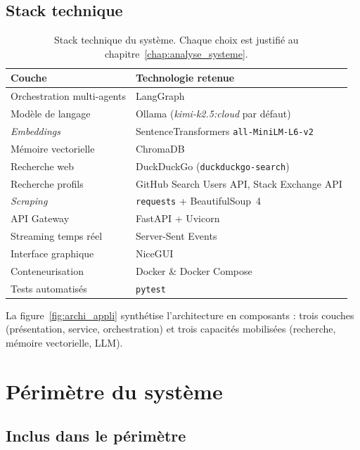 \subsection{Stack technique}

\begin{table}[H]
\centering
\small
\begin{tabular}{@{}ll@{}}
\toprule
\textbf{Couche} & \textbf{Technologie retenue} \\
\midrule
Orchestration multi-agents & LangGraph \cite{langgraph} \\
Modèle de langage          & Ollama (\emph{kimi-k2.5:cloud} par défaut) \cite{ollama} \\
\emph{Embeddings}          & SentenceTransformers \texttt{all-MiniLM-L6-v2} \cite{sbert} \\
Mémoire vectorielle        & ChromaDB \cite{chromadb} \\
Recherche web              & DuckDuckGo (\texttt{duckduckgo-search}) \\
Recherche profils          & GitHub Search Users API, Stack Exchange API \\
\emph{Scraping}            & \texttt{requests} + BeautifulSoup~4 \\
API Gateway                & FastAPI + Uvicorn \cite{fastapi} \\
Streaming temps réel       & Server-Sent Events \cite{sse_w3c} \\
Interface graphique        & NiceGUI \cite{nicegui} \\
Conteneurisation           & Docker \& Docker Compose \\
Tests automatisés          & \texttt{pytest} \\
\bottomrule
\end{tabular}
\caption{Stack technique du système. Chaque choix est justifié au chapitre~\ref{chap:analyse_systeme}.}
\end{table}

La figure~\ref{fig:archi_appli} synthétise l'architecture en composants : trois couches (présentation, service, orchestration) et trois capacités mobilisées (recherche, mémoire vectorielle, LLM).



\section{Périmètre du système}
\label{sec:perimetre}

\subsection{Inclus dans le périmètre}

